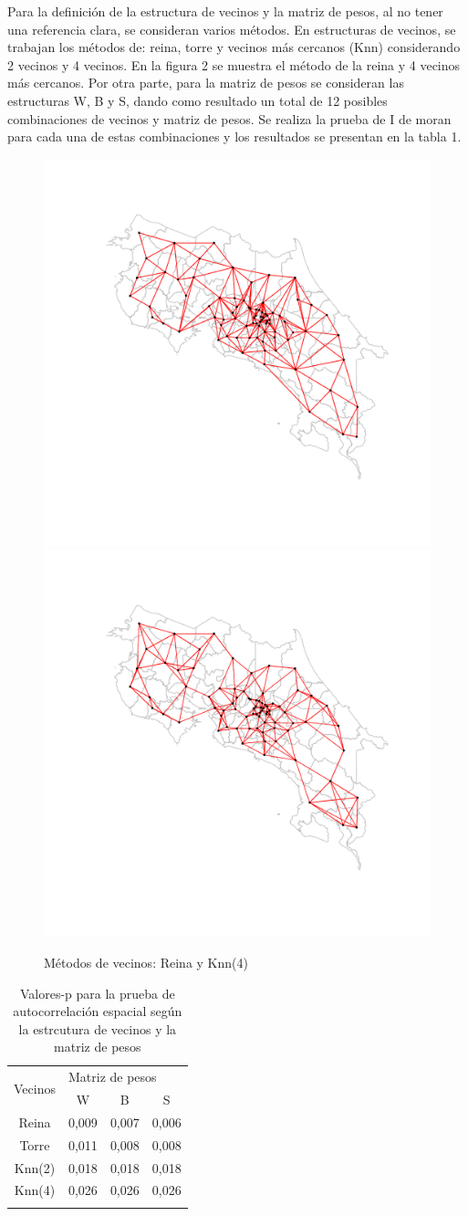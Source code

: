 \documentclass[12pt,a4paper]{article}
\begin{document}
\newline
Para la definición de la estructura de vecinos y la matriz de pesos, al no tener una referencia clara, se consideran varios métodos. En estructuras de vecinos, se trabajan los métodos de: reina, torre y vecinos más cercanos (Knn) considerando 2 vecinos y 4 vecinos. En la figura 2 se muestra el método de la reina y 4 vecinos más cercanos. Por otra parte, para la matriz de pesos se consideran las estructuras W, B y S, dando como resultado un total de 12 posibles combinaciones de vecinos y matriz de pesos. Se realiza la prueba de I de moran para cada una de estas combinaciones y los resultados se presentan en la tabla 1.
\begin{figure}[hbtp]
\centering
\includegraphics[width=.48\textwidth]{F21.pdf}
\includegraphics[width=.48\textwidth]{F22.pdf}
\caption{Métodos de vecinos: Reina y Knn(4)}
\end{figure}

\begin{table}[h]
\centering
\begin{tabular}{cccc}
\hline
\multirow{2}{*}{Vecinos} & \multicolumn{3}{l}{Matriz de pesos}\\ \cline{2-4} 
&W&B&S\\ \hline
Reina&0,009&0,007&0,006\\
Torre&0,011&0,008&0,008\\
Knn(2)&0,018&0,018&0,018\\
Knn(4)&0,026&0,026&0,026\\ \hline
\caption{Valores-p para la prueba de autocorrelación espacial según la estrcutura de vecinos y la matriz de pesos}
\end{tabular}
\end{table}
\end{document}
